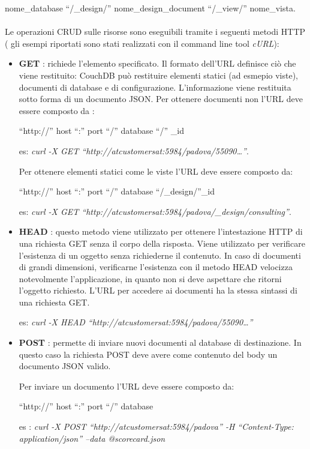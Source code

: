 nome\_database ``/\_design/'' nome\_design\_document ``/\_view/'' nome\_vista.
\\\\
Le operazioni \ac{CRUD}  sulle risorse sono
eseguibili tramite i seguenti metodi \ac{HTTP} ( gli esempi riportati sono stati
realizzati con il command line tool \textit{cURL}):
\begin{itemize}
  \item \textbf{GET} : richiede l'elemento specificato. Il formato dell'\ac{URL}
  definisce ciò che viene restituito: CouchDB può restituire elementi
  statici (ad esmepio viste), documenti di database e di configurazione.
  L'informazione viene restituita sotto forma di un documento \ac{JSON}.
  Per ottenere documenti non l'URL deve essere composto da :
  
  ``http://'' host ``:'' port ``/'' database ``/'' \_id
  
  es: \emph{curl -X GET ``http://atcustomersat:5984/padova/55090\ldots''}.
  
  Per ottenere elementi statici come le viste l'URL deve essere composto da:
  
  ``http://'' host ``:'' port  ``/'' database ``/\_design/''\_id 
  
  es: \emph{curl -X GET
  ``http://atcustomersat:5984/padova/\_design/consulting''}.
  
  \item \textbf{HEAD} : questo metodo viene utilizzato per ottenere
  l'intestazione \ac{HTTP} di una richiesta GET senza il corpo della risposta.
  Viene utilizzato per verificare l'esistenza di un oggetto senza richiederne il
  contenuto. In caso di documenti di grandi dimensioni, verificarne l'esistenza
  con il metodo HEAD velocizza notevolmente l'applicazione, in quanto non si
  deve aspettare che ritorni l'oggetto richiesto. L'\ac{URL} per accedere ai
  documenti ha la stessa sintassi di una richiesta GET.
   
  es: \emph{curl -X HEAD ``http://atcustomersat:5984/padova/55090\ldots''}
  \item \textbf{POST} : permette di inviare nuovi documenti al database di
  destinazione. In questo caso la richiesta POST deve avere come
  contenuto del body un documento \ac{JSON} valido.
  
  Per inviare un documento l'URL deve essere composto da:
  
  ``http://'' host ``:'' port ``/'' database 
  
  es : \emph{curl -X POST ``http://atcustomersat:5984/padova'' -H
  ``Content-Type:}
  \emph{application/json'' --data @scorecard.json}
  

\end{itemize}
